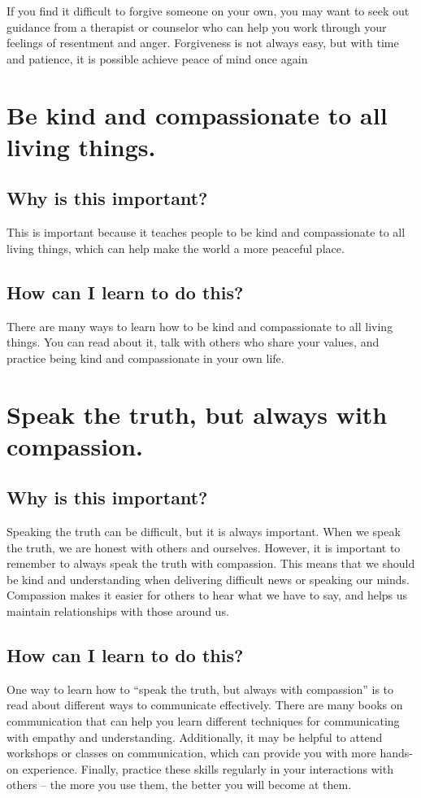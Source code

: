 \documentclass[11pt]{article}
\begin{document}
If you find it difficult to forgive someone on your own, you may want to seek out guidance from a therapist or counselor who can help you work through your feelings of resentment and anger. Forgiveness is not always easy, but with time and patience, it is possible achieve peace of mind once again

\section{Be kind and compassionate to all living things.}
\label{sec:orgd2a52dd}
\subsection{Why is this important?}
\label{sec:org7c25cf0}
This is important because it teaches people to be kind and compassionate to all living things, which can help make the world a more peaceful place.

\subsection{How can I learn to do this?}
\label{sec:org5a999d1}
There are many ways to learn how to be kind and compassionate to all living things. You can read about it, talk with others who share your values, and practice being kind and compassionate in your own life.

\section{Speak the truth, but always with compassion.}
\label{sec:org683e2b1}
\subsection{Why is this important?}
\label{sec:orgc07542c}
Speaking the truth can be difficult, but it is always important. When we speak the truth, we are honest with others and ourselves. However, it is important to remember to always speak the truth with compassion. This means that we should be kind and understanding when delivering difficult news or speaking our minds. Compassion makes it easier for others to hear what we have to say, and helps us maintain relationships with those around us.

\subsection{How can I learn to do this?}
\label{sec:org31ed4c6}
One way to learn how to ``speak the truth, but always with compassion'' is to read about different ways to communicate effectively. There are many books on communication that can help you learn different techniques for communicating with empathy and understanding. Additionally, it may be helpful to attend workshops or classes on communication, which can provide you with more hands-on experience. Finally, practice these skills regularly in your interactions with others – the more you use them, the better you will become at them.
\end{document}
